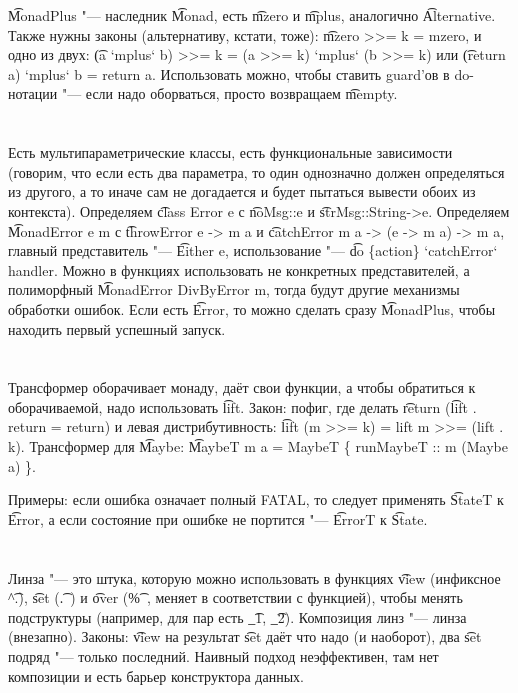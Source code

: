 \t{MonadPlus} "--- наследник \t{Monad}, есть \t{mzero} и \t{mplus}, аналогично \t{Alternative}.
Также нужны законы (альтернативу, кстати, тоже): \t{mzero >>= k = mzero}, и одно из двух:
\t{(a `mplus` b) >>= k = (a >>= k) `mplus` (b >>= k)} или \t{(return a) `mplus` b = return a}.
Использовать можно, чтобы ставить guard'ов в do-нотации "--- если надо оборваться, просто возвращаем \t{mempty}.

\section{} %
Есть мультипараметрические классы, есть функциональные зависимости (говорим, что если есть два параметра, то один однозначно
должен определяться из другого, а то иначе сам не догадается и будет пытаться вывести обоих из контекста).
Определяем \t{class Error e} с \t{noMsg::e} и \t{strMsg::String->e}.
Определяем \t{MonadError e m} с \t{throwError e -> m a} и \t{catchError m a -> (e -> m a) -> m a},
главный представитель "--- \t{Either e}, использование "--- \t{do \{action\} `catchError` handler}.
Можно в функциях использовать не конкретных представителей, а полиморфный \t{MonadError DivByError m}, тогда
будут другие механизмы обработки ошибок.
Если есть \t{Error}, то можно сделать сразу \t{MonadPlus}, чтобы находить первый успешный запуск.

\section{} %
Трансформер оборачивает монаду, даёт свои функции, а чтобы обратиться к оборачиваемой, надо использовать \t{lift}.
Закон: пофиг, где делать \t{return} (\t{lift . return = return}) и левая дистрибутивность: \t{lift (m >>= k) = lift m >>= (lift . k)}.
Трансформер для \t{Maybe}: \t{MaybeT m a = MaybeT \{ runMaybeT :: m (Maybe a) \}}.

Примеры: если ошибка означает полный FATAL, то следует применять \t{StateT} к \t{Error},
а если состояние при ошибке не портится "--- \t{ErrorT} к \t{State}.

\section{} %
Линза "--- это штука, которую можно использовать в функциях \t{view} (инфиксное \t{\^{}.}),
\t{set} (\t{.~}) и \t{over} (\t{\%~}, меняет в соответствии с функцией), чтобы менять
подструктуры (например, для пар есть \t{\_1}, \t{\_2}).
Композиция линз "--- линза (внезапно).
Законы: \t{view} на результат \t{set} даёт что надо (и наоборот), два \t{set} подряд "--- только последний.
Наивный подход неэффективен, там нет композиции и есть барьер конструктора данных.

